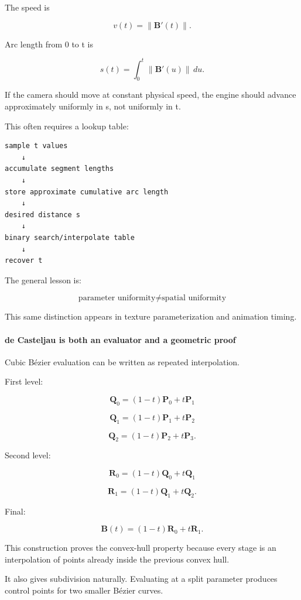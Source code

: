 The speed is

\[
v(t)=\|\mathbf B'(t)\|.
\]

Arc length from 0 to t is

\[
s(t)=\int_0^t\|\mathbf B'(u)\|\,du.
\]

If the camera should move at constant physical speed, the engine should advance approximately uniformly in s, not uniformly in t.

This often requires a lookup table:

\begin{verbatim}
sample t values
    ↓
accumulate segment lengths
    ↓
store approximate cumulative arc length
    ↓
desired distance s
    ↓
binary search/interpolate table
    ↓
recover t
\end{verbatim}

The general lesson is:

\[
\boxed{
\text{parameter uniformity}
\neq
\text{spatial uniformity}
}
\]

This same distinction appears in texture parameterization and animation timing.

\paragraph{de Casteljau is both an evaluator and a geometric proof}\label{de-casteljau-is-both-an-evaluator-and-a-geometric-proof}

Cubic Bézier evaluation can be written as repeated interpolation.

First level:

\[
\mathbf Q_0=(1-t)\mathbf P_0+t\mathbf P_1
\]

\[
\mathbf Q_1=(1-t)\mathbf P_1+t\mathbf P_2
\]

\[
\mathbf Q_2=(1-t)\mathbf P_2+t\mathbf P_3.
\]

Second level:

\[
\mathbf R_0=(1-t)\mathbf Q_0+t\mathbf Q_1
\]

\[
\mathbf R_1=(1-t)\mathbf Q_1+t\mathbf Q_2.
\]

Final:

\[
\mathbf B(t)=(1-t)\mathbf R_0+t\mathbf R_1.
\]

This construction proves the convex-hull property because every stage is an interpolation of points already inside the previous convex hull.

It also gives subdivision naturally. Evaluating at a split parameter produces control points for two smaller Bézier curves.

